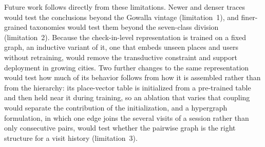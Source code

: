 Future work follows directly from these limitations. Newer and denser traces would
test the conclusions beyond the Gowalla vintage (limitation~1), and finer-grained
taxonomies would test them beyond the seven-class division (limitation~2). Because the
check-in-level representation is trained on a fixed graph, an inductive variant of it,
one that embeds unseen places and users without retraining, would remove the
transductive constraint and support deployment in growing cities. Two further changes to
the same representation would test how much of its behavior follows from how it is
assembled rather than from the hierarchy: its place-vector table is initialized from a
pre-trained table and then held near it during training, so an ablation that varies that
coupling would separate the contribution of the initialization, and a hypergraph
formulation, in which one edge joins the several visits of a session rather than only
consecutive pairs, would test whether the pairwise graph is the right structure for a
visit history (limitation~3).
